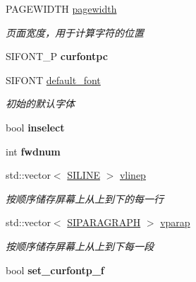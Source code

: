 \begin{DoxyCompactItemize}
P\+A\+G\+E\+W\+I\+D\+TH \hyperlink{class_s_i_t_e_x_t_afcb828b5d1da58d0f60088097e8c107b}{pagewidth}
\begin{DoxyCompactList}\small\item\em 页面宽度，用于计算字符的位置 \end{DoxyCompactList}\item 
\mbox{\label{class_s_i_t_e_x_t_a7f543155db7c4b28c4268ea34d07665b}} 
S\+I\+F\+O\+N\+T\+\_\+P {\bfseries curfontpc}
\item 
S\+I\+F\+O\+NT \hyperlink{class_s_i_t_e_x_t_abdacda1b7e48087a0aa2905702cb1d68}{default\+\_\+font}
\begin{DoxyCompactList}\small\item\em 初始的默认字体 \end{DoxyCompactList}\item 
\mbox{\label{class_s_i_t_e_x_t_a2e5859744c880a32ed48594f61c4a230}} 
bool {\bfseries inselect}
\item 
\mbox{\label{class_s_i_t_e_x_t_adeaaaf6ca797c54b57b97ee6bbe41541}} 
int {\bfseries fwdnum}
\item 
std\+::vector$<$ \hyperlink{struct_s_i_r_a_n_g_e}{S\+I\+L\+I\+NE} $>$ \hyperlink{class_s_i_t_e_x_t_abdabb47ab701f95f73b806df2c440347}{vlinep}
\begin{DoxyCompactList}\small\item\em 按顺序储存屏幕上从上到下的每一行 \end{DoxyCompactList}\item 
std\+::vector$<$ \hyperlink{struct_s_i_r_a_n_g_e}{S\+I\+P\+A\+R\+A\+G\+R\+A\+PH} $>$ \hyperlink{class_s_i_t_e_x_t_aeeeed4da4b7633b913a7a98336a91d75}{vparap}
\begin{DoxyCompactList}\small\item\em 按顺序储存屏幕上从上到下每一段 \end{DoxyCompactList}\item 
\mbox{\label{class_s_i_t_e_x_t_adf51b732a1a52c962864a3a38c5b0041}} 
bool {\bfseries set\+\_\+curfontp\+\_\+f}
\end{DoxyCompactItemize}
